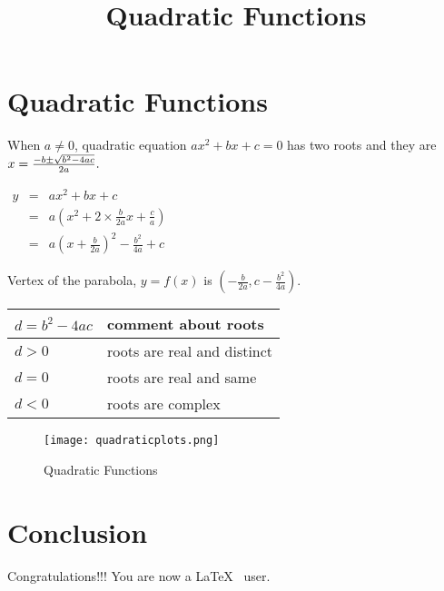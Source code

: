\documentclass{article}
\title{Quadratic Functions}
\begin{document}
\maketitle

\section{Quadratic Functions}
When $a \ne 0$, quadratic equation $ax^2 + bx + c = 0$ has two roots and they are
$x = {-b \pm \sqrt{b^2-4ac} \over 2a}.$ 

$ \begin{array}{rcl}
y & = & a x^{2}+bx+c\\
  & = & a\left(x^{2}+2\times\frac{b}{2a}x+\frac{c}{a}\right)\\
  & = & a\left(x+\frac{b}{2a}\right)^2 - \frac{b^2}{4a} + c
\end{array} $ 

Vertex of the parabola, $y = f(x)$ is $\left(-\frac{b}{2a}, c - \frac{b^2}{4a}\right)$.

\begin{center}
\begin{tabular}{|l|l|}
\hline
 $d = b^2 - 4ac$ & comment about roots \\ 
 \hline
 $d>0$ & roots are real and distinct \\  
 \hline
 $d = 0$ & roots are real and same \\
 \hline
 $d<0$ & roots are complex \\
\hline
\end{tabular}
\end{center}

\begin{figure}[h!]
\centering
\texttt{[image: quadraticplots.png]}
\caption{Quadratic Functions}
\label{fig:quadretic}
\end{figure}

\section{Conclusion}
Congratulations!!! You are now a \LaTeX~ user.
\end{document}
